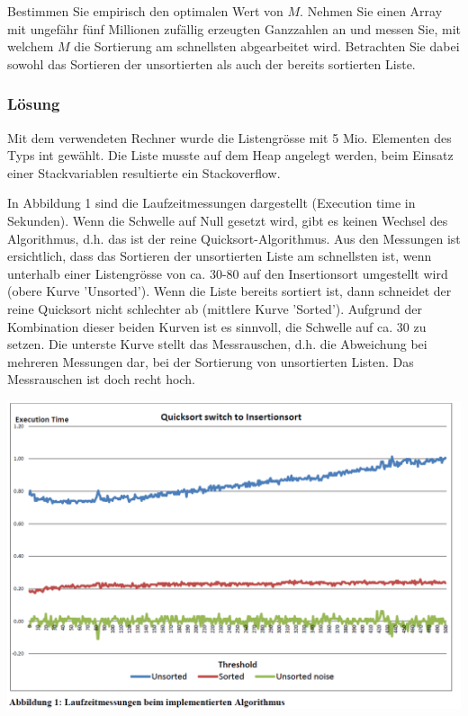 Bestimmen Sie empirisch den optimalen Wert von $M$. Nehmen Sie einen Array mit ungefähr fünf Millionen
zufällig erzeugten Ganzzahlen an und messen Sie, mit welchem $M$ die Sortierung am schnellsten abgearbeitet wird. Betrachten Sie dabei sowohl das Sortieren der unsortierten als auch der bereits sortierten Liste.



\subsubsection{Lösung}

Mit dem verwendeten Rechner wurde die Listengrösse mit 5 Mio. Elementen des Typs int gewählt. Die Liste musste auf dem Heap angelegt werden, beim Einsatz einer Stackvariablen resultierte ein Stackoverflow.

In Abbildung 1 sind die Laufzeitmessungen dargestellt (Execution time in Sekunden). Wenn die Schwelle auf Null gesetzt wird, gibt es keinen Wechsel des Algorithmus, d.h. das ist der reine Quicksort-Algorithmus. Aus den Messungen ist ersichtlich, dass das Sortieren der unsortierten Liste am schnellsten ist, wenn unterhalb einer Listengrösse von ca. 30-80 auf den Insertionsort umgestellt wird (obere Kurve 'Unsorted'). Wenn die Liste bereits sortiert ist, dann schneidet der reine Quicksort nicht schlechter ab (mittlere Kurve 'Sorted'). Aufgrund der Kombination dieser beiden Kurven ist es sinnvoll, die Schwelle auf ca. 30 zu setzen.
Die unterste Kurve stellt das Messrauschen, d.h. die Abweichung bei mehreren Messungen dar, bei der Sortierung von unsortierten Listen. Das Messrauschen ist doch recht hoch.

\includegraphics[width=.8\linewidth]{900-Praktika/prak03/pic.PNG}



\noindent\makebox[\linewidth]{\rule{\paperwidth}{0.4pt}}

\noindent\makebox[\linewidth]{\rule{\paperwidth}{0.4pt}}

\noindent\makebox[\linewidth]{\rule{\paperwidth}{0.4pt}}

\noindent\makebox[\linewidth]{\rule{\paperwidth}{0.4pt}}

